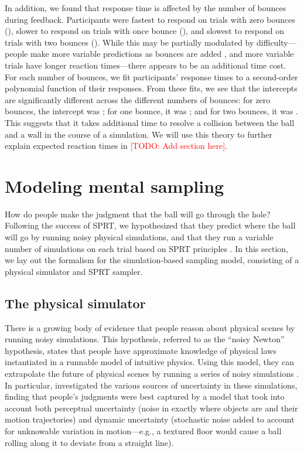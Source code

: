 \documentclass[10pt,letterpaper]{article}
\newcommand{\TODO}[1]{\textcolor{red}{[TODO: #1]}}
\begin{document}
In addition, we found that response time is affected by the number of bounces during feedback. Participants were fastest to respond on trials with zero bounces (\RTZeroBounces{}), slower to respond on trials with once bounce (\RTOneBounces{}), and slowest to respond on trials with two bounces (\RTTwoBounces{}). While this may be partially modulated by difficulty---people make more variable predictions as bounces are added \cite{Smith:2013fc}, and more variable trials have longer reaction times---there appears to be an additional time cost. For each number of bounces, we fit participants' response times to a second-order polynomial function of their responses. From these fits, we see that the intercepts are significantly different across the different numbers of bounces: for zero bounces, the intercept was \InterceptZeroBounces{}; for one bounce, it was \InterceptOneBounces{}; and for two bounces, it was \InterceptTwoBounces{}. This suggests that it takes additional time to resolve a collision between the ball and a wall in the course of a simulation. We will use this theory to further explain expected reaction times in \TODO{Add section here}.

\section{Modeling mental sampling}

How do people make the judgment that the ball will go through the hole? Following the success of SPRT, we hypothesized that they predict where the ball will go by running noisy physical simulations, and that they run a variable number of simulations on each trial based on SPRT principles \cite{wald1947sequential}. In this section, we lay out the formalism for the simulation-based sampling model, consisting of a physical simulator and SPRT sampler.

\subsection{The physical simulator}

There is a growing body of evidence that people reason about physical scenes by running noisy simulations. This hypothesis, referred to as the ``noisy Newton'' hypothesis, states that people have approximate knowledge of physical laws instantiated in a runnable model of intuitive physics. Using this model, they can extrapolate the future of physical scenes by running a series of noisy simulations \cite{Smith:2013fc,Battaglia2013,Smith:2013ug,Smith:2013th,Smith:2014tx,Ullman:2014ut,Hamrick:2015}. In particular,  investigated the various sources of uncertainty in these simulations, finding that people's judgments were best captured by a model that took into account both perceptual uncertainty (noise in exactly where objects are and their motion trajectories) and dynamic uncertainty (stochastic noise added to account for unknowable variation in motion---e.g., a textured floor would cause a ball rolling along it to deviate from a straight line).
\end{document}
